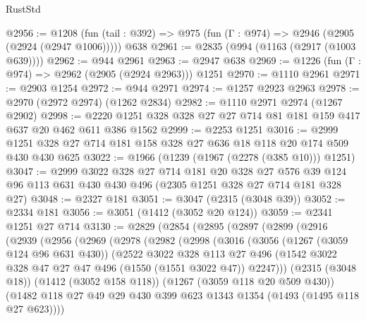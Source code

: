 \begin{lexlean}{RustStd}
\begin{coremodule}
{\begin{coremodule}
{{{{{{{{{{@2956 := @1208
    (fun (tail : @392) => @975 (fun (Γ : @974) => @2946 (@2905 (@2924 (@2947 @1006)))))
    @638
@2961 := @2835 (@994 (@1163 (@2917 (@1003 @639))))
@2962 := @944 @2961
@2963 := @2947 @638
@2969 := @1226 (fun (Γ : @974) => @2962 (@2905 (@2924 @2963))) @1251
@2970 := @1110 @2961
@2971 := @2903 @1254
@2972 := @944 @2971
@2974 := @1257 @2923 @2963
@2978 := @2970 (@2972 @2974) (@1262 @2834)
@2982 := @1110 @2971 @2974 (@1267 @2902)
@2998 := @2220 @1251 @328 @328 @27 @27 @714 @81 @181 @159 @417 @637 @20 @462 @611 @386 @1562
@2999 := @2253 @1251
@3016 := @2999 @1251 @328 @27 @714 @181 @158 @328 @27 @636 @18 @118 @20 @174 @509 @430 @430 @625
@3022 := @1966 (@1239 (@1967 (@2278 (@385 @10))) @1251)
@3047 := @2999
    @3022
    @328
    @27
    @714
    @181
    @20
    @328
    @27
    @576
    @39
    @124
    @96
    @113
    @631
    @430
    @430
    @496
    (@2305 @1251 @328 @27 @714 @181 @328 @27)
@3048 := @2327 @181
@3051 := @3047 (@2315 (@3048 @39))
@3052 := @2334 @181
@3056 := @3051 (@1412 (@3052 @20 @124))
@3059 := @2341 @1251 @27 @714
@3130 := @2829
    (@2854
      (@2895
        (@2897
          (@2899
            (@2916
              (@2939
                (@2956
                  (@2969
                    (@2978
                      (@2982
                        (@2998
                          (@3016
                            (@3056
                              (@1267 (@3059 @124 @96 @631 @430))
                              (@2522
                                @3022
                                @328
                                @113
                                @27
                                @496
                                (@1542
                                  @3022
                                  @328
                                  @47
                                  @27
                                  @47
                                  @496
                                  (@1550 (@1551 @3022 @47))
                                  @2247)))
                            (@2315 (@3048 @18))
                            (@1412 (@3052 @158 @118))
                            (@1267 (@3059 @118 @20 @509 @430))
                            (@1482
                              @118
                              @27
                              @49
                              @29
                              @430
                              @399
                              @623
                              @1343
                              @1354
                              (@1493 (@1495 @118 @27 @623))))
}}}}}}}}}}
\end{coremodule}}
\end{coremodule}
\end{lexlean}
